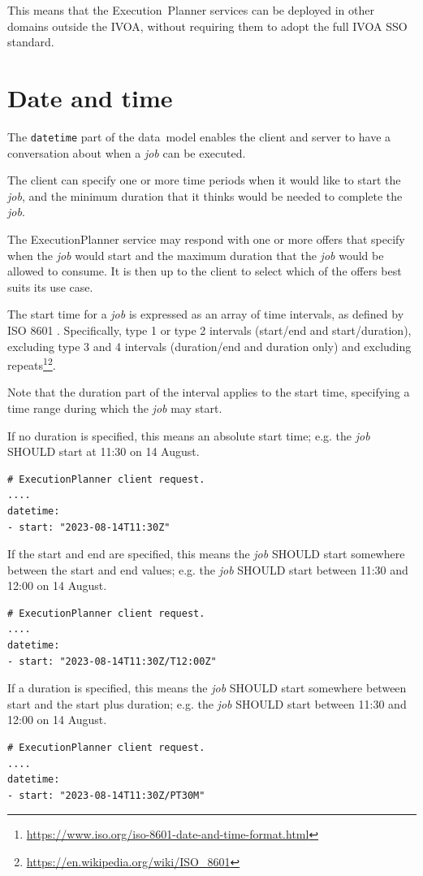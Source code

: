 \documentclass[11pt,a4paper]{ivoa}
\newcommand{\datamodel} {data~model}
\newcommand{\ivoa} {IVOA}
\newcommand{\execplanner} {ExecutionPlanner}
\newcommand{\executionplanner} {Execution~Planner}
\newcommand{\codeword}[1] {\texttt{#1}}
\newcommand{\footurl}[1] {\footnote{\url{#1}}}
\newcommand{\job} {\textit{job}}
\begin{document}
This means that the \executionplanner{} services can be deployed in other domains outside the \ivoa{},
without requiring them to adopt the full \ivoa{} SSO standard.

\section{Date and time}
\label{date-time}

The \codeword{datetime} part of the \datamodel{} enables the client and server to have a
conversation about when a \job{} can be executed.

The client can specify one or more time periods when it would like to start the \job{},
and the minimum duration that it thinks would be needed to complete the \job{}.

The \execplanner{} service may respond with one or more offers that specify when the \job{}
would start and the maximum duration that the \job{} would be allowed to consume.
It is then up to the client to select which of the offers best suits its use case.

The start time for a \job{} is expressed as an array of time intervals, as defined by
ISO 8601 \citep{std:iso8601}.
Specifically, type 1 or type 2 intervals (start/end and start/duration), excluding type 3 and 4 intervals
(duration/end and duration only) and excluding
repeats\footurl{https://www.iso.org/iso-8601-date-and-time-format.html}\footurl{https://en.wikipedia.org/wiki/ISO_8601}.

Note that the duration part of the interval applies to the start time, specifying a
time range during which the \job{} may start.

If no duration is specified, this means an absolute start time;
e.g. the \job{} SHOULD start at 11:30 on 14 August.
\begin{lstlisting}[]
# ExecutionPlanner client request.
....
datetime:
- start: "2023-08-14T11:30Z"
\end{lstlisting}

If the start and end are specified, this means the \job{} SHOULD start somewhere between
the start and end values;
e.g. the \job{} SHOULD start between 11:30 and 12:00 on 14 August.
\begin{lstlisting}[]
# ExecutionPlanner client request.
....
datetime:
- start: "2023-08-14T11:30Z/T12:00Z"
\end{lstlisting}

If a duration is specified, this means the \job{} SHOULD start somewhere between
start and the start plus duration;
e.g. the \job{} SHOULD start between 11:30 and 12:00 on 14 August.
\begin{lstlisting}[]
# ExecutionPlanner client request.
....
datetime:
- start: "2023-08-14T11:30Z/PT30M"
\end{lstlisting}
\end{document}
